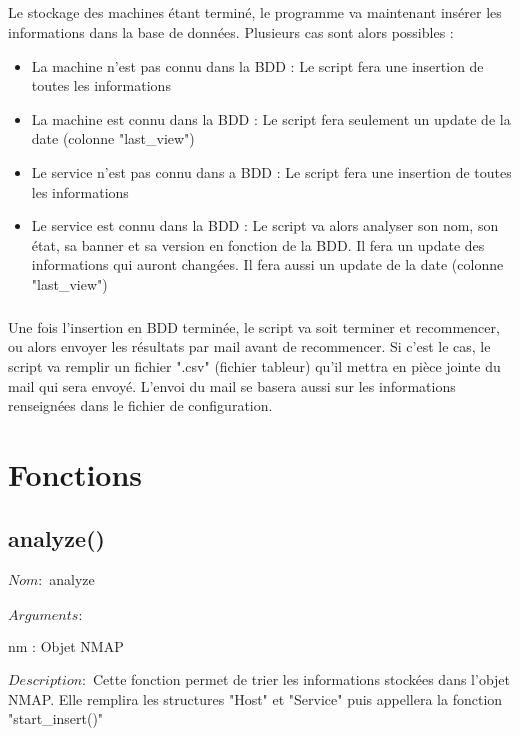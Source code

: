 \documentclass[12pt]{report}
\begin{document}
		\paragraph{}
			Le stockage des machines étant terminé, le programme va maintenant insérer les informations dans la base de données. Plusieurs cas sont alors possibles :
			\begin{itemize}
				\item La machine n'est pas connu dans la BDD : Le script fera une insertion de toutes les informations
				\item La machine est connu dans la BDD : Le script fera seulement un update de la date (colonne "last\_view")
				\item Le service n'est pas connu dans a BDD : Le script fera une insertion de toutes les informations
				\item Le service est connu dans la BDD : Le script va alors analyser son nom, son état, sa banner et sa version en fonction de la BDD. Il fera un update des informations qui auront changées. Il fera aussi un update de la date (colonne "last\_view")
			\end{itemize}
		\paragraph{}
			Une fois l'insertion en BDD terminée, le script va soit terminer et recommencer, ou alors envoyer les résultats par mail avant de recommencer. Si c'est le cas, le script va remplir un fichier ".csv" (fichier tableur) qu'il mettra en pièce jointe du mail qui sera envoyé. L'envoi du mail se basera aussi sur les informations renseignées dans le fichier de configuration.
	\chapter{Fonctions}
		\section{analyze()}
			{\setlength{\parindent}{0cm}
			$Nom :$ analyze\\\\
			}
			$Arguments :$
			\begin{description}
				\item nm : Objet NMAP\\
			\end{description}
			$Description : $ Cette fonction permet de trier les informations stockées dans l'objet NMAP. Elle remplira les structures "Host" et "Service" puis appellera la fonction "start\_insert()"
\end{document}

